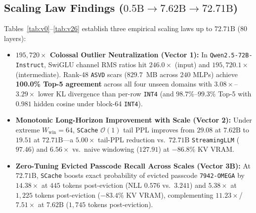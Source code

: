 \documentclass[10pt,twocolumn]{article}
\begin{document}
\subsection{Scaling Law Findings ($0.5\text{B} \to 7.62\text{B} \to 72.71\text{B}$)}
Tables~\ref{tab:v0}--\ref{tab:v26} establish three empirical scaling laws up to $72.71\text{B}$ ($80$ layers):
\begin{itemize}
    \item \textbf{$195{,}720\times$ Colossal Outlier Neutralization (Vector 1):} In \texttt{Qwen2.5-72B-Instruct}, SwiGLU channel RMS ratios hit $246.0\times$ (input) and $195{,}720.1\times$ (intermediate). Rank-48 \texttt{ASVD} scars ($829.7$~MB across $240$ MLPs) achieve \textbf{100.0\% Top-5 agreement} across all four unseen domains with $3.08\times$--$3.29\times$ lower KL divergence than per-row \texttt{INT4} (and $98.7\%$--$99.3\%$ Top-5 with $0.981$ hidden cosine under block-64 \texttt{INT4}).
    \item \textbf{Monotonic Long-Horizon Improvement with Scale (Vector 2):} Under extreme $W_{\text{win}}=64$, \texttt{SCache} $\mathcal{O}(1)$ tail PPL improves from $29.08$ at $7.62\text{B}$ to $\mathbf{19.51}$ at $72.71\text{B}$---a $\mathbf{5.00\times}$ tail-PPL reduction vs.\ $72.71\text{B}$ \texttt{StreamingLLM} ($97.46$) and $6.56\times$ vs.\ naive windowing ($127.91$) at $-86.8\%$ KV VRAM.
    \item \textbf{Zero-Tuning Evicted Passcode Recall Across Scales (Vector 3B):} At $72.71\text{B}$, \texttt{SCache} boosts exact probability of evicted passcode \texttt{7942-OMEGA} by $\mathbf{14.38\times}$ at $445$ tokens post-eviction (NLL $0.576$ vs.\ $3.241$) and $\mathbf{5.38\times}$ at $1{,}225$ tokens post-eviction ($-83.4\%$ KV VRAM), complementing $11.23\times$/$7.51\times$ at $7.62\text{B}$ ($1{,}745$ tokens post-eviction).
\end{itemize}
\end{document}
